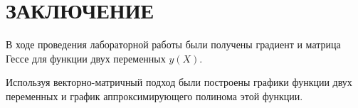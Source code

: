 \section*{ЗАКЛЮЧЕНИЕ}

В ходе проведения лабораторной работы были получены градиент и матрица Гессе
для функции двух переменных $y(X)$.

Используя векторно-матричный подход были построены графики
функции двух переменных и график аппроксимирующего полинома
этой функции. 

\newpage
